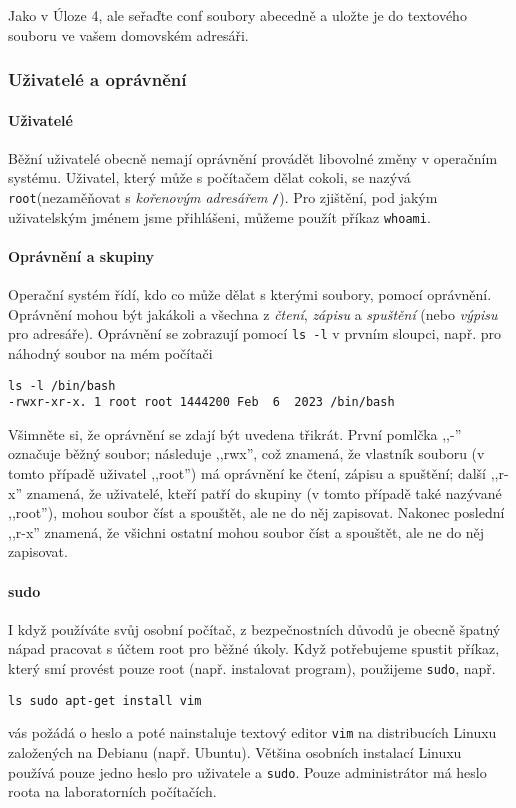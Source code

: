 \begin{exercise}
    Jako v Úloze 4, ale seřaďte conf soubory abecedně a uložte je do textového souboru ve vašem domovském adresáři.
\end{exercise}

\subsubsection{Uživatelé a oprávnění}

\paragraph{Uživatelé}
Běžní uživatelé obecně nemají oprávnění provádět libovolné změny v operačním systému. Uživatel, který může s počítačem dělat cokoli, se nazývá \verb|root|(nezaměňovat s \emph{kořenovým adresářem} \verb|/|). Pro zjištění, pod jakým uživatelským jménem jsme přihlášeni, můžeme použít příkaz \verb|whoami|.

\paragraph{Oprávnění a skupiny}

Operační systém řídí, kdo co může dělat s kterými soubory, pomocí oprávnění. Oprávnění mohou být jakákoli a všechna z \emph{čtení}, \emph{zápisu} a \emph{spuštění} (nebo \emph{výpisu} pro adresáře). Oprávnění se zobrazují pomocí \verb|ls -l| v prvním sloupci, např. pro náhodný soubor na mém počítači
\begin{verbatim}
ls -l /bin/bash
-rwxr-xr-x. 1 root root 1444200 Feb  6  2023 /bin/bash
\end{verbatim}

Všimněte si, že oprávnění se zdají být uvedena třikrát. První pomlčka ,,-'' označuje běžný soubor; následuje ,,rwx'', což znamená, že vlastník souboru (v tomto případě uživatel ,,root'') má oprávnění ke čtení, zápisu a spuštění; další ,,r-x'' znamená, že uživatelé, kteří patří do skupiny (v tomto případě také nazývané ,,root''), mohou soubor číst a spouštět, ale ne do něj zapisovat. Nakonec poslední ,,r-x'' znamená, že všichni ostatní mohou soubor číst a spouštět, ale ne do něj zapisovat.

\paragraph{sudo}

I když používáte svůj osobní počítač, z bezpečnostních důvodů je obecně špatný nápad pracovat s účtem root pro běžné úkoly. Když potřebujeme spustit příkaz, který smí provést pouze root (např. instalovat program), použijeme \verb|sudo|, např.
\begin{verbatim}
ls sudo apt-get install vim
\end{verbatim}
vás požádá o heslo a poté nainstaluje textový editor \verb|vim| na distribucích Linuxu založených na Debianu (např. Ubuntu). Většina osobních instalací Linuxu používá pouze jedno heslo pro uživatele a \verb|sudo|. Pouze administrátor má heslo roota na laboratorních počítačích.

